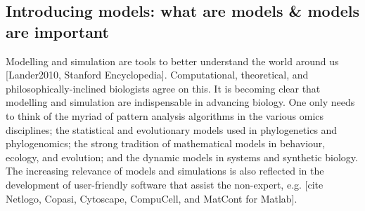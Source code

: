 \subsection{Introducing models: what are models & models are important}

Modelling and simulation are tools to better understand the world around us [Lander2010, Stanford Encyclopedia]. Computational, theoretical, and philosophically-inclined biologists agree on this.  It is becoming clear that modelling and simulation are indispensable in advancing biology. One only needs to think of the myriad of pattern analysis algorithms in the various omics disciplines; the statistical and evolutionary models used in phylogenetics and phylogenomics; the strong tradition of mathematical models in behaviour, ecology, and evolution; and the dynamic models in systems and synthetic biology. The increasing relevance of models and simulations is also reflected in the development of user-friendly software that assist the non-expert, e.g. [cite Netlogo, Copasi, Cytoscape, CompuCell, and MatCont for Matlab].

  